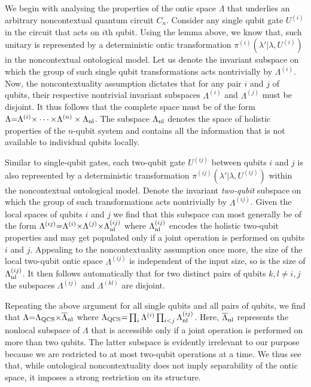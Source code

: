\documentclass[prl,twocolumn,amsmath,amssymb,nofootinbib]{revtex4-1}
\newcommand\s[1]{_{\rm #1}}
\begin{document}
We begin with analysing the properties of the ontic space $\Lambda$ that underlies an arbitrary noncontextual quantum circuit $C_n$.
Consider any single qubit gate $U^{(i)}$ in the circuit that acts on $i$th qubit.
Using the lemma above, we know that, such unitary is represented by a deterministic ontic transformation $\pi^{(i)}(\lambda'|\lambda,U^{(i)})$ in the noncontextual ontological model.
Let us denote the invariant subspace on which the group of such single qubit transformations acts nontrivially by $\Lambda^{(i)}$. 
Now, the noncontextuality assumption dictates that for any pair $i$ and $j$ of qubits, their respective nontrivial invariant subspaces $\Lambda^{(i)}$ and $\Lambda^{(j)}$ must be disjoint.
It thus follows that the complete space must be of the form $\Lambda {=} \Lambda^{(i)} {\times} \cdots {\times} \Lambda^{(n)}\times\Lambda\s{nl}$.
The subspace $\Lambda\s{nl}$ denotes the space of holistic properties of the $n$-qubit system and contains all the information that is not available to individual qubits locally.

Similar to single-qubit gates, each two-qubit gate $U^{(ij)}$ between qubits $i$ and $j$ is also represented by a deterministic transformation $\pi^{(ij)}(\lambda'|\lambda,U^{(ij)})$ within the noncontextual ontological model.
Denote the invariant \textit{two-qubit} subspace on which the group of such transformations acts nontrivially by $\Lambda^{(ij)}$.
Given the local spaces of qubits $i$ and $j$ we find that this subspace can most generally be of the form $\Lambda^{(ij)}{=}\Lambda^{(i)}{\times}\Lambda^{(j)}{\times}\Lambda\s{nl}^{(ij)}$ where $\Lambda\s{nl}^{(ij)}$ encodes the holistic two-qubit properties and may get populated only if a joint operation is performed on qubits $i$ and $j$.
Appealing to the noncontextuality assumption once more, the size of the local two-qubit ontic space $\Lambda^{(ij)}$ is independent of the input size, so is the size of $\Lambda\s{nl}^{(ij)}$.
It then follows automatically that for two distinct pairs of qubits $k,l {\neq} i,j$ the subspaces $\Lambda^{(ij)}$ and $\Lambda^{(kl)}$ are disjoint.

Repeating the above argument for all single qubits and all pairs of qubits, we find that $\Lambda {=} \Lambda\s{QCS}{\times}\overline{\Lambda}\s{nl}$ where $\Lambda\s{QCS} {=} \prod_i\Lambda^{(i)}\prod_{i<j}\Lambda\s{nl}^{(ij)}$.
Here, $\overline{\Lambda}\s{nl}$ represents the nonlocal subspace of $\Lambda$ that is accessible only if a joint operation is performed on more than two qubits.
The latter subspace is evidently irrelevant to our purpose because we are restricted to at most two-qubit operations at a time.
We thus see that, while ontological noncontextuality does not imply separability of the ontic space, it imposes a strong restriction on its structure.
\end{document}
